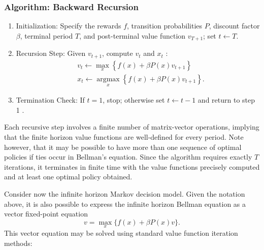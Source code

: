 \documentclass[\topdir/lecture\_notes.tex]{subfiles}
\begin{document}
\subsubsection{Algorithm: Backward Recursion}
\begin{enumerate}
    \item Initialization: Specify the rewards $f$, transition probabilities $P$, discount factor $\beta$, terminal period $T$, and post-terminal value function $v_{T+1}$; set $t \leftarrow T$.
  \item Recursion Step: Given $v_{t+1}$, compute $v_{t}$ and $x_{t}$ :
\begin{equation*}
\begin{aligned}
& v_{t} \leftarrow \max _{x}\left\{f(x)+\beta P(x) v_{t+1}\right\} \\
& x_{t} \leftarrow \underset{x}{\operatorname{argmax}}\left\{f(x)+\beta P(x) v_{t+1}\right\} .
\end{aligned}
\end{equation*}

  \item Termination Check: If $t=1$, stop; otherwise set $t \leftarrow t-1$ and return to step 1 .
\end{enumerate}

Each recursive step involves a finite number of matrix-vector operations, implying that the finite horizon value functions are well-defined for every period. Note however, that it may be possible to have more than one sequence of optimal policies if ties occur in Bellman's equation. Since the algorithm requires exactly $T$ iterations, it terminates in finite time with the value functions precisely computed and at least one optimal policy obtained.

Consider now the infinite horizon Markov decision model. Given the notation above, it is also possible to express the infinite horizon Bellman equation as a vector fixed-point equation
\begin{equation*}
v=\max _{x}\{f(x)+\beta P(x) v\} .
\end{equation*}
This vector equation may be solved using standard value function iteration methods:
\end{document}
